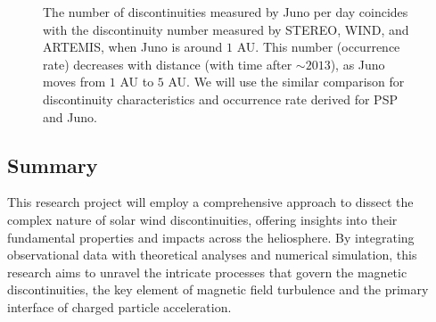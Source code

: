 \documentclass[
  letterpaper,
  DIV=11,
  numbers=noendperiod]{scrartcl}
\begin{document}
\begin{figure}


\caption{\label{fig-rate}The number of discontinuities measured by Juno per day coincides with the discontinuity number measured by STEREO, WIND, and ARTEMIS, when Juno is around \(1\) AU. This number (occurrence rate) decreases with distance (with time after \(\sim 2013\)), as Juno moves from \(1\) AU to \(5\) AU. We will use the similar comparison for discontinuity characteristics and occurrence rate derived for PSP and Juno.}

\end{figure}%

\subsection{Summary}\label{summary}

This research project will employ a comprehensive approach to dissect the complex nature of solar wind discontinuities, offering insights into their fundamental properties and impacts across the heliosphere. By integrating observational data with theoretical analyses and numerical simulation, this research aims to unravel the intricate processes that govern the magnetic discontinuities, the key element of magnetic field turbulence and the primary interface of charged particle acceleration.
\end{document}
